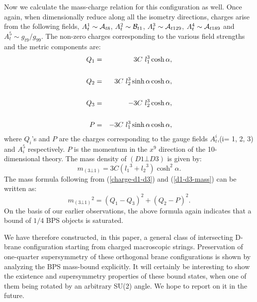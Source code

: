 \documentclass[a4paper,12pt,fleqn,cite,epsfig]{article}
\begin{document}
Now we calculate the mass-charge relation for this configuration as well. 
Once again, when dimensionally reduce along all the 
isometry directions, charges arise from the following fields,
$A^1_t \sim {\cal{A}}_{t 8}$, 
$A^2_t \sim {\cal{B}}_{t 1}$,
$A^3_t \sim {\cal{A}}_{t 1 2 9}$, 
$A^4_t \sim {\cal{A}}_{t 1 8 9}$ and $A^5_t \sim g_{t 9}/g_{9 9}$.
The non-zero charges corresponding to the various field strengths and
the metric components are:
\begin{eqnarray}
Q_1 &=& 3C~l_1^3 \cosh\alpha, \cr
& \cr
Q_2 &=& 3C~l_2^3 \sinh\alpha\cosh\alpha, \cr
& \cr
Q_3 &=& -3C~l_2^3 \cosh\alpha, \cr
& \cr
P &=& -3C~l_1^3 \sinh \alpha\cosh\alpha,
\label{charge-d1-d3}
\end{eqnarray}
where $Q_i$'s and $P$ are the charges corresponding to the gauge fields
$A^i_t$,(i= 1, 2, 3) and $A^5_i$ respectively.
$P$ is the momentum in the $x^9$ direction of the 10- dimensional
theory.
The mass density of $(D1\bot D3)$ is given by:
\begin{equation}
m_{(3\bot 1)} = 3C ({l_1}^3 + {l_2}^3)\cosh^2\alpha.
\label{d1-d3-mass}
\end{equation}
The mass formula following from (\ref{charge-d1-d3}) and
(\ref{d1-d3-mass}) can be written as:
\begin{equation}
{m_{(3\bot 1)}}^2 = (Q_1 - Q_3)^2 + (Q_2 - P)^2.
\label{mass-charge2}
\end{equation}
On the basis of our earlier observations, the above formula 
again indicates that a bound of $1/4$ BPS objects is saturated. 


We have therefore constructed, in this paper, a general class 
of intersecting D- brane configuration starting from charged 
macroscopic strings. Preservation of one-quarter supersymmetry 
of these orthogonal brane
configurations is shown by analyzing the BPS mass-bound explicitly.
It will certainly be interesting to show the existence and
supersymmetry properties of these bound states, when one of 
them being rotated by an arbitrary SU(2) angle. 
We hope to report on it in the future.
\end{document}
